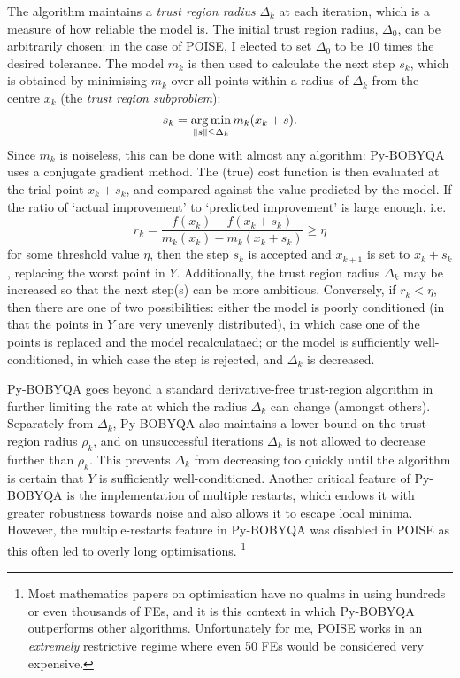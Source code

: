 The algorithm maintains a \textit{trust region radius} $\Delta_k$ at each iteration, which is a measure of how reliable the model is.
The initial trust region radius, $\Delta_0$, can be arbitrarily chosen: in the case of POISE, I elected to set $\Delta_0$ to be $10$ times the desired tolerance.
The model $m_k$ is then used to calculate the next step $s_k$, which is obtained by minimising $m_k$ over all points within a radius of $\Delta_k$ from the centre $x_k$ (the \textit{trust region subproblem}):
\begin{equation}
    \label{eq:trust_region_subproblem}
    s_k = \operatorname*{arg\,min}_{\lVert s \rVert \leq \Delta_k} m_k(x_k + s).
\end{equation}
Since $m_k$ is noiseless, this can be done with almost any algorithm: Py-BOBYQA uses a conjugate gradient method.
The (true) cost function is then evaluated at the trial point $x_k + s_k$, and compared against the value predicted by the model.
If the ratio of `actual improvement' to `predicted improvement' is large enough, i.e.
\begin{equation}
    \label{eq:trust_region_threshold}
    r_k = \frac{f(x_k) - f(x_k + s_k)}{m_k(x_k) - m_k(x_k + s_k)} \geq \eta
\end{equation}
for some threshold value $\eta$, then the step $s_k$ is accepted and $x_{k+1}$ is set to $x_k + s_k$, replacing the worst point in $Y$.
Additionally, the trust region radius $\Delta_k$ may be increased so that the next step(s) can be more ambitious.
Conversely, if $r_k < \eta$, then there are one of two possibilities: either the model is poorly conditioned (in that the points in $Y$ are very unevenly distributed), in which case one of the points is replaced and the model recalculataed; or the model is sufficiently well-conditioned, in which case the step is rejected, and $\Delta_k$ is decreased.

Py-BOBYQA goes beyond a standard derivative-free trust-region algorithm in further limiting the rate at which the radius $\Delta_k$ can change (amongst others).
Separately from $\Delta_k$, Py-BOBYQA also maintains a lower bound on the trust region radius $\rho_k$, and on unsuccessful iterations $\Delta_k$ is not allowed to decrease further than $\rho_k$.
This prevents $\Delta_k$ from decreasing too quickly until the algorithm is certain that $Y$ is sufficiently well-conditioned.\autocite{Powell2003MP}
Another critical feature of Py-BOBYQA is the implementation of multiple restarts, which endows it with greater robustness towards noise and also allows it to escape local minima.\autocite{Cartis2019ACMTMS,Cartis2022O}
However, the multiple-restarts feature in Py-BOBYQA was disabled in POISE as this often led to overly long optimisations.%
\footnote{Most mathematics papers on optimisation have no qualms in using hundreds or even thousands of FEs, and it is this context in which Py-BOBYQA outperforms other algorithms. Unfortunately for me, POISE works in an \textit{extremely} restrictive regime where even 50 FEs would be considered very expensive.}

